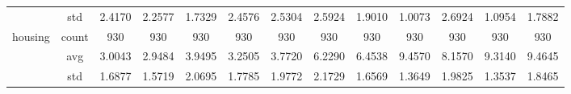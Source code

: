 \begin{table}[htbp]
{\begin{tabular}{rcccccccccccc}
			                                   & std                                    & 2.4170                                                                             & 2.2577                                                                    & 1.7329                                                                    & 2.4576                                                                    & 2.5304                                        & 2.5924                                      & 1.9010                                         & 1.0073                                         & 2.6924                                         & 1.0954                                         & 1.7882                                         \\
			housing                            & count                                  & 930                                                                                & 930                                                                       & 930                                                                       & 930                                                                       & 930                                           & 930                                         & 930                                            & 930                                            & 930                                            & 930                                            & 930                                            \\
			                                   & avg                                    & 3.0043                                                                             & \cellcolor[rgb]{ .776,  .937,  .808}\textcolor[rgb]{ 0,  .38,  0}{2.9484} & 3.9495                                                                    & 3.2505                                                                    & 3.7720                                        & 6.2290                                      & 6.4538                                         & 9.4570                                         & 8.1570                                         & 9.3140                                         & 9.4645                                         \\
			                                   & std                                    & 1.6877                                                                             & 1.5719                                                                    & 2.0695                                                                    & 1.7785                                                                    & 1.9772                                        & 2.1729                                      & 1.6569                                         & 1.3649                                         & 1.9825                                         & 1.3537                                         & 1.8465                                         \\

\end{tabular}}
\end{table}
